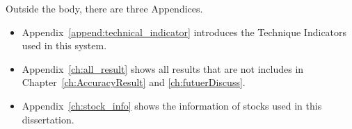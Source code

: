 Outside the body, there are three Appendices.
\begin{itemize}
	\item Appendix~\ref{append:technical_indicator} introduces the Technique Indicators used in this system.
	\item Appendix~\ref{ch:all_result} shows all results that are not includes in Chapter~\ref{ch:AccuracyResult} and \ref{ch:futuerDiscuss}.
	\item Appendix~\ref{ch:stock_info} shows the information of stocks used in this dissertation.
\end{itemize}




